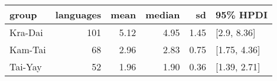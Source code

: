 
\begin{tabular}[t]{lrrrrl}
\toprule
group & languages & mean & median & sd & 95\% HPDI\\
\midrule
Kra-Dai & 101 & 5.12 & 4.95 & 1.45 & {}[2.9, 8.36]\\
Kam-Tai & 68 & 2.96 & 2.83 & 0.75 & {}[1.75, 4.36]\\
Tai-Yay & 52 & 1.96 & 1.90 & 0.36 & {}[1.39, 2.71]\\
\bottomrule
\end{tabular}
